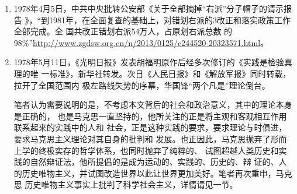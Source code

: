 \begin{enumerate}
  即使是``包干到户''这种落后小农经济的生产力、生产关系，国家在1984年这个``特大丰
  收年''已经无法去完成大批量的``统购统销''了。1985年，国家改行``合同订购''制度并
  在年底要求对订购数量逐年降低，统购统销的精神纲领仍在，并且``合同订购''给的农产
  品价格更低。\cite{diyibugaige}

  \begin{quotation}
    根据农业经济专家\footnote{汪晖此处所指专家为曾任国务院农村发展研究中心发展研
      究所市场研究室主任等职务的卢迈}的研究，1978~1985年城乡收入的差距是缩小的，
    从1985年起扩大。1989年到1991年农民收入增长基本停滞，城乡收入差距又恢复
    到1978年以前的情况。1993年以后，由于国家提高粮食价格、乡镇企业增长快、外出务
    工人口收入增长等原因，农村收入增长较快，但在城市劳动力大量剩余的情况下，这一
    势头正在改变。\cite{wangxiandai}
  \end{quotation}

  三农问题和工农业剪刀差是一个实践上的大难题，在数年内长期困扰着中国。即使幻想国
  家在1980年后不惜损害工业、全球竞争力等一系列代价抽调其他方面资金、资料用来补贴
  农业生产发展，那么农业生产力提高又将带来时代环境下所不能解决的大量剩余劳动力问
  题——城市和农村均无法吸收。

  1992年底，统购统销正式退出历史舞台。而到了今日，我们已经开始了农业工业化的道路。
  我们放在文后再讨论这两个节点吧。

\item 1978年4月5日，中共中央批转公安部《关于全部摘掉“右派”分子帽子的请示报告
  》，``到1981年，在全面复查的基础上，对错划右派的3改正和落实政策工作全部完成。全
  国共改正错划右派54万人，占原划右派总数
  的98\%''\url{http://www.zgdsw.org.cn/n/2013/0125/c244520-20323571.html}。

\item 1978年5月11日，《光明日报》发表胡福明原作后经多次修订的《实践是检验真理的唯
  一标准》，新华社转发。次日《人民日报》和《解放军报》同时转载，拉开了全国范围内
  极左路线失势的序幕，华国锋``两个凡是''理论倒台。

  笔者认为需要说明的是，不考虑本文背后的社会和政治意义，其中的理论本身是正确的，
  也是马克思一直坚持的，他所关注的正是将主观和客观相互作用联系起来的实践中的人和
  社会，正是这种实践的要求，要求理论与时俱进，要求马克思主义理论对其自身的批判和
  发展。也正因此，马克思抛弃了形而上学的终极实存的哲学体系，也同时抛弃了纯粹的、
  试图超越人类历史和实践的自然辩证法，他所提倡的是成为运动的、实践的、历史的、辩
  证的、人的历史唯物主义，并试图改造世界以此让世界更加美好。笔者再次重申，马克思
  历史唯物主义事实上批判了科学社会主义，详情请见一节。


\end{enumerate}
